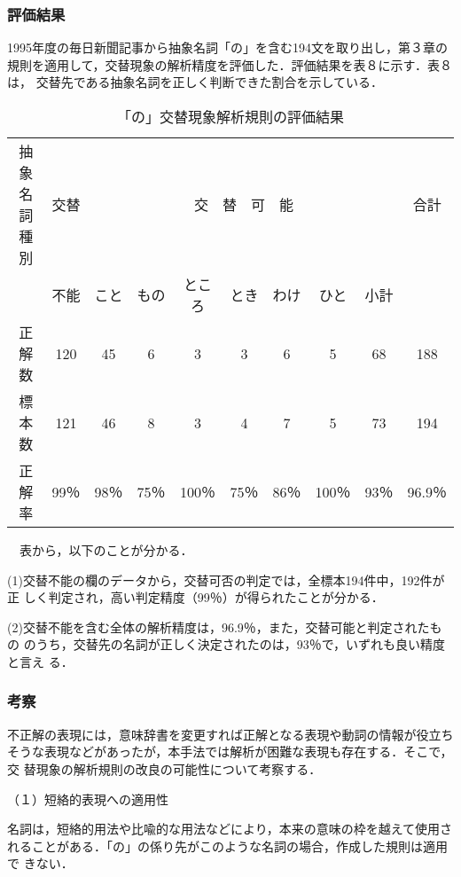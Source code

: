 \subsubsection{評価結果}

1995年度の毎日新聞記事から抽象名詞「の」を含む194文を取り出し，第３章の
規則を適用して，交替現象の解析精度を評価した．評価結果を表８に示す．表８は，
交替先である抽象名詞を正しく判断できた割合を示している．

\begin{table}[htbp]
\caption{「の」交替現象解析規則の評価結果}
\begin{center}
\begin{tabular}{|c|c|c|c|c|c|c|c|c|c|} \hline
抽象名詞種別 & 交替 & \multicolumn{7}{|c|}{交　替　可　能} &  合計\\ \cline{3-9}
 & 不能 & こと & もの & ところ &とき & わけ & ひと & 小計 & \\ \hline
正解数 & 120 & 45 & 6 & 3 & 3 & 6 & 5 & 68 & 188\\ \hline
標本数 & 121 & 46 & 8 & 3 & 4 & 7 & 5 & 73 & 194\\ \hline
正解率 & 99％ & 98％ & 75％ & 100％ & 75％ & 86％ &  100％ & 93％ & 96.9％\\ \hline
\end{tabular}
\end{center}
\end{table}

　表から，以下のことが分かる．

\vspace{6pt}

(1)交替不能の欄のデータから，交替可否の判定では，全標本194件中，192件が正
しく判定され，高い判定精度（99％）が得られたことが分かる．

(2)交替不能を含む全体の解析精度は，96.9％，また，交替可能と判定されたもの
のうち，交替先の名詞が正しく決定されたのは，93％で，いずれも良い精度と言え
る．

\subsubsection{考察}

不正解の表現には，意味辞書を変更すれば正解となる表現や動詞の情報が役立ち
そうな表現などがあったが，本手法では解析が困難な表現も存在する．そこで，交
替現象の解析規則の改良の可能性について考察する．

（１）短絡的表現への適用性

名詞は，短絡的用法や比喩的な用法などにより，本来の意味の枠を越えて使用さ
れることがある．「の」の係り先がこのような名詞の場合，作成した規則は適用で
きない．

